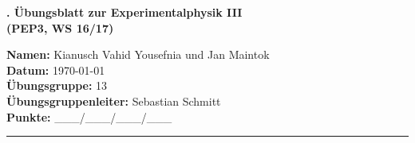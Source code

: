\begin{centering}
  \LARGE{\textbf{\nr. Übungsblatt zur Experimentalphysik III\\ (PEP3, WS 16/17)}}\\
  \vspace*{20pt}

\normalsize{\textbf{Namen:} Kianusch Vahid Yousefnia und Jan Maintok} \\
\textbf{Datum: } \today \\
 \textbf{Übungsgruppe:} 13\\
 \textbf{Übungsgruppenleiter:} Sebastian Schmitt \\

\vspace*{10pt}
 \textbf{Punkte: } \_\_\_/\_\_\_/\_\_\_/\_\_\_
 
 \end{centering}

 \vspace*{10pt}

 \rule{\textwidth}{1pt}

